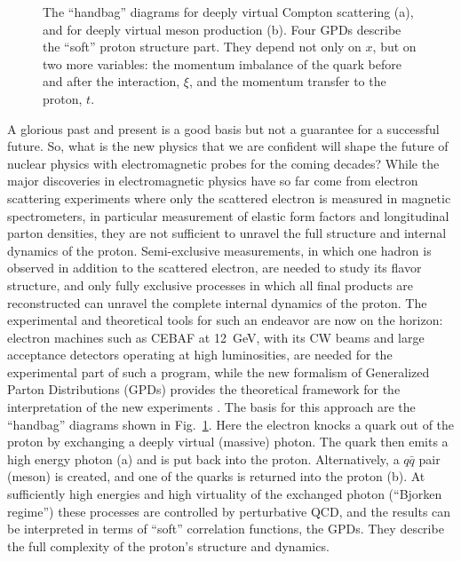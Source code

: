 \begin{figure}[htbp]
\vspace{7.7cm} 
\caption{\small{The ``handbag'' diagrams for deeply virtual Compton 
scattering (a), and for deeply virtual meson production (b).  Four GPDs 
describe the ``soft'' proton structure part.  They depend not only on $x$, 
but on two more variables: the momentum imbalance of the quark before and 
after the interaction, $\xi$, and the momentum transfer to the proton, $t$.}}
\label{hand_bag}
\end{figure}

A glorious past and present is a good basis but not a guarantee for a 
successful future. So, what is the new physics that we are confident will 
shape the future of nuclear physics with electromagnetic probes for the 
coming decades?  While the major discoveries in electromagnetic physics 
have so far come from electron scattering experiments where only the 
scattered electron is measured in magnetic spectrometers, in particular 
measurement of elastic form factors and longitudinal parton densities, they 
are not sufficient to unravel the full structure and internal dynamics of 
the proton.  Semi-exclusive measurements, in which one hadron is observed 
in addition to the scattered electron, are needed to study its flavor 
structure, and only fully exclusive processes in which all final products 
are reconstructed can unravel the complete internal dynamics of the proton.
The experimental and theoretical tools for such an endeavor are now on the 
horizon: electron machines such as CEBAF at 12~GeV, with its CW beams 
and large acceptance detectors operating at high luminosities, are needed 
for the experimental part of such a program, while the new formalism of 
Generalized Parton Distributions (GPDs) provides the theoretical framework 
for the interpretation of the new experiments
\cite{mueller,Ji97_1,Ji97_2,Radyushkin:1996nd,Radyushkin:1997ki}.  The basis 
for this approach are the ``handbag'' diagrams shown in Fig.~\ref{hand_bag}.
Here the electron knocks a quark out of the proton by exchanging a deeply 
virtual (massive) photon. The quark then emits a high energy photon (a) and 
is put back into the proton. Alternatively, a $q\bar q$ pair (meson) is 
created, and one of the quarks is returned into the proton (b).   At 
sufficiently high energies and high virtuality of the exchanged photon 
(``Bjorken regime'') these processes are controlled by perturbative QCD, and 
the results can be interpreted in terms of ``soft'' correlation functions, the 
GPDs. They describe the full complexity of the proton's structure and 
dynamics.        


